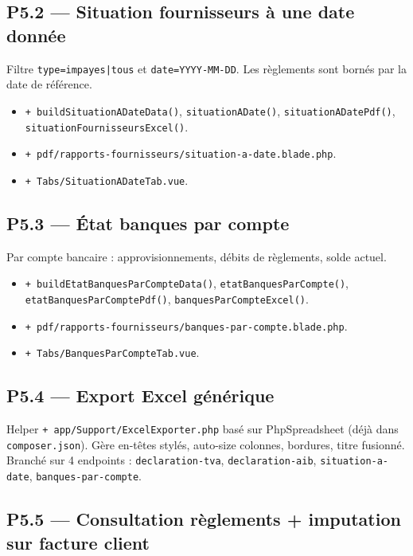 \documentclass[11pt,a4paper]{article}
\newcommand{\newfile}[1]{\texttt{\small\textcolor{accent}{+ #1}}}
\begin{document}
\subsection{P5.2 --- Situation fournisseurs à une date donnée}

Filtre \texttt{type=impayes|tous} et \texttt{date=YYYY-MM-DD}.
Les règlements sont bornés par la date de référence.

\begin{itemize}[leftmargin=1.4em]
  \item \newfile{buildSituationADateData()}, \texttt{situationADate()},
    \texttt{situationADatePdf()}, \texttt{situationFournisseursExcel()}.
  \item \newfile{pdf/rapports-fournisseurs/situation-a-date.blade.php}.
  \item \newfile{Tabs/SituationADateTab.vue}.
\end{itemize}

\subsection{P5.3 --- État banques par compte}

Par compte bancaire : approvisionnements, débits de règlements, solde actuel.

\begin{itemize}[leftmargin=1.4em]
  \item \newfile{buildEtatBanquesParCompteData()}, \texttt{etatBanquesParCompte()},
    \texttt{etatBanquesParComptePdf()}, \texttt{banquesParCompteExcel()}.
  \item \newfile{pdf/rapports-fournisseurs/banques-par-compte.blade.php}.
  \item \newfile{Tabs/BanquesParCompteTab.vue}.
\end{itemize}

\subsection{P5.4 --- Export Excel générique}

Helper \newfile{app/Support/ExcelExporter.php} basé sur PhpSpreadsheet (déjà
dans \texttt{composer.json}). Gère en-têtes stylés, auto-size colonnes,
bordures, titre fusionné. Branché sur 4 endpoints :
\texttt{declaration-tva}, \texttt{declaration-aib}, \texttt{situation-a-date},
\texttt{banques-par-compte}.

\subsection{P5.5 --- Consultation règlements + imputation sur facture client}
\end{document}
